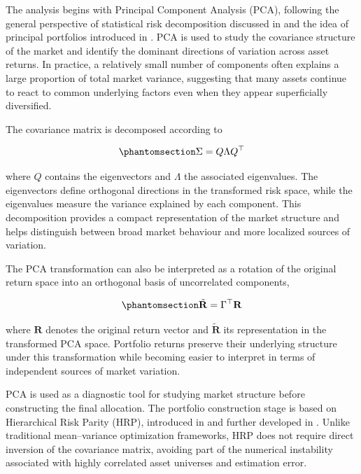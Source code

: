\documentclass[
  12pt,
  letterpaper,
]{book}
\begin{document}
The analysis begins with Principal Component Analysis (PCA), following
the general perspective of statistical risk decomposition discussed in
 and the idea of principal
portfolios introduced in .
PCA is used to study the covariance structure of the market and identify
the dominant directions of variation across asset returns. In practice,
a relatively small number of components often explains a large
proportion of total market variance, suggesting that many assets
continue to react to common underlying factors even when they appear
superficially diversified.

The covariance matrix is decomposed according to

\begin{equation}\phantomsection\label{eq-spectral-decomposition}{
\Sigma = Q \Lambda Q^\top
}\end{equation}

where \(Q\) contains the eigenvectors and \(\Lambda\) the associated
eigenvalues. The eigenvectors define orthogonal directions in the
transformed risk space, while the eigenvalues measure the variance
explained by each component. This decomposition provides a compact
representation of the market structure and helps distinguish between
broad market behaviour and more localized sources of variation.

The PCA transformation can also be interpreted as a rotation of the
original return space into an orthogonal basis of uncorrelated
components,

\begin{equation}\phantomsection\label{eq-pca-rotation}{
\tilde{\mathbf{R}} = \Gamma^\top \mathbf{R}
}\end{equation}

where \(\mathbf{R}\) denotes the original return vector and
\(\tilde{\mathbf{R}}\) its representation in the transformed PCA space.
Portfolio returns preserve their underlying structure under this
transformation while becoming easier to interpret in terms of
independent sources of market variation.

PCA is used as a diagnostic tool for studying market structure before
constructing the final allocation. The portfolio construction stage is
based on Hierarchical Risk Parity (HRP), introduced in
 and further developed in
. Unlike traditional
mean--variance optimization frameworks, HRP does not require direct
inversion of the covariance matrix, avoiding part of the numerical
instability associated with highly correlated asset universes and
estimation error.
\end{document}
